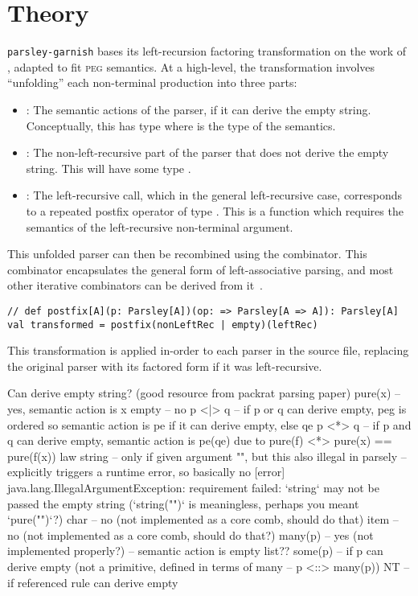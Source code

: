 \documentclass[../../main.tex]{subfiles}
\begin{document}
\label{sec:factor-leftrec}

\section{Theory}
\texttt{parsley-garnish} bases its left-recursion factoring transformation on the work of \textcite{baars_leftrec_2004}, adapted to fit \textsc{peg} semantics.
At a high-level, the transformation involves ``unfolding'' each non-terminal production into three parts:
\begin{itemize}
  \item {}: The semantic actions of the parser, if it can derive the empty string. Conceptually, this has type  where  is the type of the semantics.
  \item {}: The non-left-recursive part of the parser that does not derive the empty string. This will have some type .
  \item {}: The left-recursive call, which in the general left-recursive case, corresponds to a repeated postfix operator of type . This is a function which requires the semantics of the left-recursive non-terminal argument.
\end{itemize}
%
This unfolded parser can then be recombined using the  combinator.
This combinator encapsulates the general form of left-associative parsing, and most other iterative combinators can be derived from it~\cite{willis_parsley_2023}.
\begin{verbatim}
// def postfix[A](p: Parsley[A])(op: => Parsley[A => A]): Parsley[A]
val transformed = postfix(nonLeftRec | empty)(leftRec)
\end{verbatim}
%
This transformation is applied in-order to each parser in the source file, replacing the original parser with its factored form if it was left-recursive.

Can derive empty string? (good resource from packrat parsing paper)
pure(x) -- yes, semantic action is x
empty -- no
p <|> q -- if p or q can derive empty, peg is ordered so semantic action is pe if it can derive empty, else qe
p <*> q -- if p and q can derive empty, semantic action is pe(qe) due to pure(f) <*> pure(x) == pure(f(x)) law
string -- only if given argument "", but this also illegal in parsely -- explicitly triggers a runtime error, so basically no
    [error] java.lang.IllegalArgumentException: requirement failed: `string` may not be passed the empty string (`string("")` is meaningless, perhaps you meant `pure("")`?)
char -- no (not implemented as a core comb, should do that)
item -- no (not implemented as a core comb, should do that?)
many(p) -- yes (not implemented properly?) -- semantic action is empty list??
some(p) -- if p can derive empty (not a primitive, defined in terms of many -- p <::> many(p))
NT -- if referenced rule can derive empty
\end{document}
